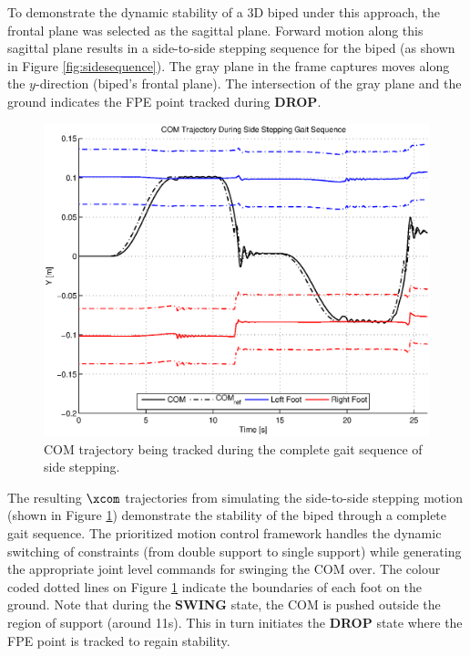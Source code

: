 To demonstrate the dynamic stability of a 3D biped under this approach, the frontal plane was selected as the sagittal plane. Forward motion along this sagittal plane results in a side-to-side stepping sequence for the biped (as shown in Figure \ref{fig:sidesequence}). The gray plane in the frame captures moves along the $y$-direction (biped's frontal plane). The intersection of the gray plane and the ground indicates the FPE point tracked during \textbf{DROP}. 

\begin{figure}[!h]
	\centering
    \includegraphics[scale=0.7]{fig/simulations/sidecomtraj.eps}
  	\caption{COM trajectory being tracked during the complete gait sequence of side stepping.}
	\label{fig:sidecomtraj}
\end{figure}

The resulting $\xcom$ trajectories from simulating the side-to-side stepping motion (shown in Figure \ref{fig:sidecomtraj}) demonstrate the stability of the biped through a complete gait sequence. The prioritized motion control framework handles the dynamic switching of constraints (from double support to single support) while generating the appropriate joint level commands for swinging the COM over. The colour coded dotted lines on Figure \ref{fig:sidecomtraj} indicate the boundaries of each foot on the ground. Note that during the \textbf{SWING} state, the COM is pushed outside the region of support (around 11s). This in turn initiates the \textbf{DROP} state where the FPE point is tracked to regain stability.

